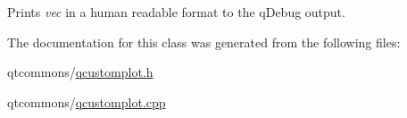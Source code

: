 Prints {\itshape vec} in a human readable format to the q\+Debug output. 

The documentation for this class was generated from the following files\+:\begin{DoxyCompactItemize}
\item 
qtcommons/\mbox{\hyperlink{qcustomplot_8h}{qcustomplot.\+h}}\item 
qtcommons/\mbox{\hyperlink{qcustomplot_8cpp}{qcustomplot.\+cpp}}\end{DoxyCompactItemize}
